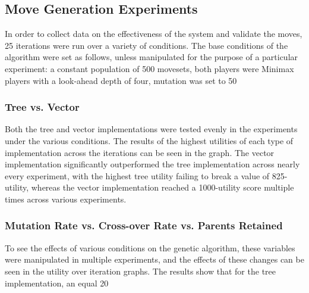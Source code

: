 \documentclass{acm_proc_article-sp}
\begin{document}
    \subsection{Move Generation Experiments}

In order to collect data on the effectiveness of the system and validate the moves, 25 iterations were run over a variety of conditions. The base conditions of the algorithm were set as follows, unless manipulated for the purpose of a particular experiment: a constant population of 500 movesets, both players were Minimax players with a look-ahead depth of four, mutation was set to 50%

    \subsubsection{Tree vs. Vector}

Both the tree and vector implementations were tested evenly in the experiments under the various conditions. The results of the highest utilities of each type of implementation across the iterations can be seen in the graph. The vector implementation significantly outperformed the tree implementation across nearly every experiment, with the highest tree utility failing to break a value of 825-utility, whereas the vector implementation reached a 1000-utility score multiple times across various experiments. 

    \subsubsection{Mutation Rate vs. Cross-over Rate vs. Parents Retained}

To see the effects of various conditions on the genetic algorithm, these variables were manipulated in multiple experiments, and the effects of these changes can be seen in the utility over iteration graphs. The results show that for the tree implementation, an equal 20%
\end{document}
